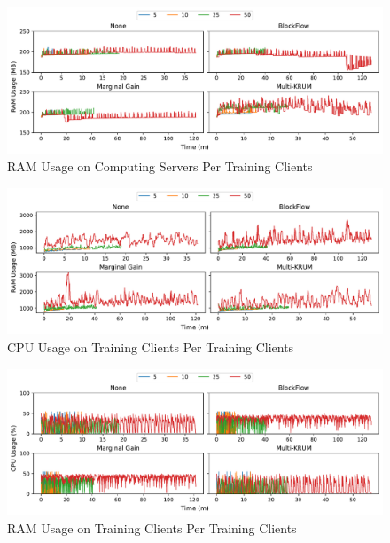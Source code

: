 \vfill

\begin{figure}[!h]
    \centering
    \includegraphics[width=\textwidth]{graphics/clients/ram_server.pdf}
    \caption{RAM Usage on Computing Servers Per Training Clients}
    \label{fig:ram_clients_servers}
\end{figure}

\vfill

\begin{figure}[!h]
    \centering
    \includegraphics[width=\textwidth]{graphics/clients/ram_miner.pdf}
    \caption{CPU Usage on Training Clients Per Training Clients}
    \label{fig:ram_clients_miners}
\end{figure}

\clearpage

\begin{figure}[!h]
    \centering
    \includegraphics[width=\textwidth]{graphics/clients/cpu_client.pdf}
    \caption{RAM Usage on Training Clients Per Training Clients}
    \label{fig:cpu_clients_clients}
\end{figure}

